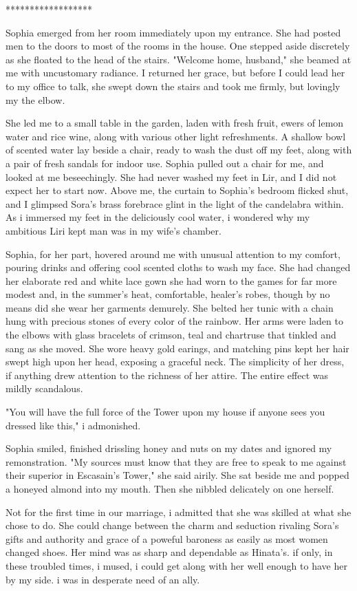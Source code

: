 \documentclass{article}
\begin{document}
******************

Sophia emerged from her room immediately upon my entrance. She had posted men to the doors to most of the rooms in the house. One stepped aside discretely as she floated to the head of the stairs. "Welcome home, husband," she beamed at me with uncustomary radiance. I returned her grace, but before I could lead her to my office to talk, she swept down the stairs and took me firmly, but lovingly my the elbow.

She led me to a small table in the garden, laden with fresh fruit, ewers of lemon water and rice wine, along with various other light refreshments. A shallow bowl of scented water lay beside a chair, ready to wash the dust off my feet, along with a pair of fresh sandals for indoor use. Sophia pulled out a chair for me, and looked at me beseechingly. She had never washed my feet in Lir, and I did not expect her to start now. Above me, the curtain to Sophia's bedroom flicked shut, and I glimpsed Sora's brass forebrace glint in the light of the candelabra within. As i immersed my feet in the deliciously cool water, i wondered why my ambitious Liri kept man was in my wife's chamber.

Sophia, for her part, hovered around me with unusual attention to my comfort, pouring drinks and offering cool scented cloths to wash my face. She had changed her elaborate red and white lace gown she had worn to the games for far more modest and, in the summer's heat, comfortable, healer's robes, though by no means did she wear her garments demurely. She belted her tunic with a chain hung with precious stones of every color of the rainbow. Her arms were laden to the elbows with glass bracelets of crimson, teal and chartruse that tinkled and sang as she moved. She wore heavy gold earings, and matching pins kept her hair swept high upon her head, exposing a graceful neck. The simplicity of her dress, if anything drew attention to the richness of her attire. The entire effect was mildly scandalous.

"You will have the full force of the Tower upon my house if anyone sees you dressed like this," i admonished.

Sophia smiled, finished drissling honey and nuts on my dates and ignored my remonstration. "My sources must know that they are free to speak to me against their superior in Escasain's Tower," she said airily. She sat beside me and popped a honeyed almond into my mouth. Then she nibbled delicately on one herself.

Not for the first time in our marriage, i admitted that she was skilled at what she chose to do. She could change between the charm and seduction rivaling Sora's gifts and authority and grace of a poweful baroness as easily as most women changed shoes. Her mind was as sharp and dependable as Hinata's. if only, in these troubled times, i mused, i could get along with her well enough to have her by my side. i was in desperate need of an ally.
\end{document}
